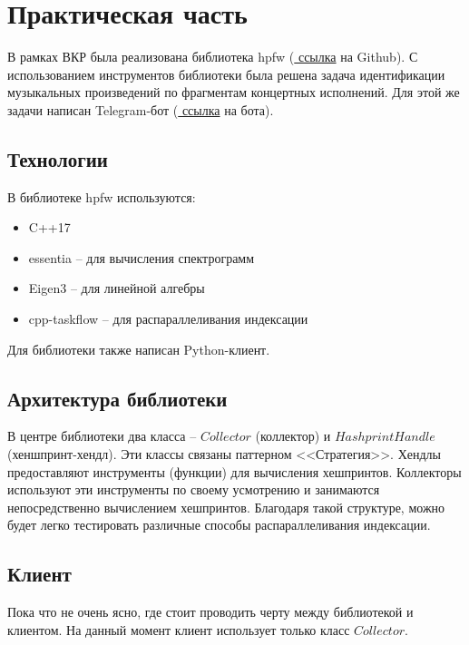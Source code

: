 \chapter{Практическая часть}
\label{cha:ch_2}

В рамках ВКР была реализована
библиотека hpfw (\href{https://github.com/kisasexypantera94/hpfw}{\color{blue} ссылка} на Github).
С использованием инструментов библиотеки была решена задача идентификации музыкальных
произведений по фрагментам концертных исполнений. Для этой же
задачи написан Telegram-бот (\href{https://t.me/hpfw_bot}{\color{blue} ссылка} на бота).

\section{Технологии}
В библиотеке hpfw используются:
\begin{itemize}
    \item C++17
    \item essentia -- для вычисления спектрограмм
    \item Eigen3 -- для линейной алгебры
    \item cpp-taskflow -- для распараллеливания индексации
\end{itemize}

Для библиотеки также написан Python-клиент.

\section{Архитектура библиотеки}
В центре библиотеки два класса -- $Collector$ (коллектор) и $HashprintHandle$ (хеншпринт-хендл).
Эти классы связаны паттерном <<Стратегия>>. Хендлы предоставляют инструменты (функции) для вычисления
хешпринтов. Коллекторы используют эти инструменты по своему усмотрению и занимаются непосредственно
вычислением хешпринтов. Благодаря такой структуре, можно будет легко тестировать различные способы
распараллеливания индексации.

\section{Клиент}
Пока что не очень ясно, где стоит проводить черту между библиотекой и клиентом. На данный момент
клиент использует только класс $Collector$.

